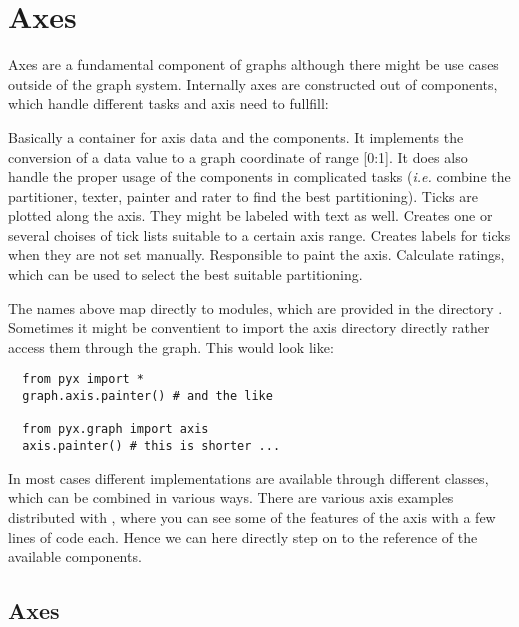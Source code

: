 \chapter{Axes\label{axis}}

Axes are a fundamental component of graphs although there might be use
cases outside of the graph system. Internally axes are constructed out
of components, which handle different tasks and axis need to fullfill:

\begin{definitions}
  Basically a container for axis data and the components. It
  implements the conversion of a data value to a graph coordinate of
  range [0:1]. It does also handle the proper usage of the components
  in complicated tasks (\emph{i.e.} combine the partitioner, texter,
  painter and rater to find the best partitioning).
  Ticks are plotted along the axis. They might be labeled with text as
  well.
  Creates one or several choises of tick lists suitable to a certain
  axis range.
  Creates labels for ticks when they are not set manually.
  Responsible to paint the axis.
  Calculate ratings, which can be used to select the best suitable
  partitioning.
\end{definitions}

The names above map directly to modules, which are provided in the
directory . Sometimes it might be conventient to
import the axis directory directly rather access them through the
graph. This would look like:
\begin{verbatim}
  from pyx import *
  graph.axis.painter() # and the like

  from pyx.graph import axis
  axis.painter() # this is shorter ...
\end{verbatim}

In most cases different implementations are available through
different classes, which can be combined in various ways. There are
various axis examples distributed with \PyX{}, where you can see some
of the features of the axis with a few lines of code each. Hence we
can here directly step on to the reference of the available
components.

\section{Axes}


